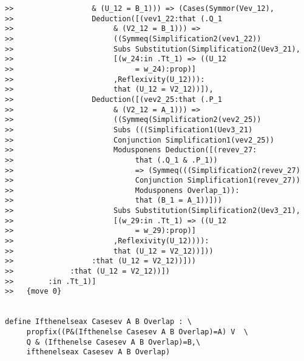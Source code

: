 \documentclass[12pt]{article}
\begin{document}
\begin{verbatim}
>>                  & (U_12 = B_1))) => (Cases(Symmor(Vev_12),
>>                  Deduction([(vev1_22:that (.Q_1 
>>                       & (V2_12 = B_1))) => 
>>                       ((Symmeq(Simplification2(vev1_22)) 
>>                       Subs Substitution(Simplification2(Uev3_21),
>>                       [(w_24:in .Tt_1) => ((U_12 
>>                            = w_24):prop)]
>>                       ,Reflexivity(U_12))):
>>                       that (U_12 = V2_12))]),
>>                  Deduction([(vev2_25:that (.P_1 
>>                       & (V2_12 = A_1))) => 
>>                       ((Symmeq(Simplification2(vev2_25)) 
>>                       Subs (((Simplification1(Uev3_21) 
>>                       Conjunction Simplification1(vev2_25)) 
>>                       Modusponens Deduction([(revev_27:
>>                            that (.Q_1 & .P_1)) 
>>                            => (Symmeq(((Simplification2(revev_27) 
>>                            Conjunction Simplification1(revev_27)) 
>>                            Modusponens Overlap_1)):
>>                            that (B_1 = A_1))]))
>>                       Subs Substitution(Simplification2(Uev3_21),
>>                       [(w_29:in .Tt_1) => ((U_12 
>>                            = w_29):prop)]
>>                       ,Reflexivity(U_12)))):
>>                       that (U_12 = V2_12))]))
>>                  :that (U_12 = V2_12))]))
>>             :that (U_12 = V2_12))])
>>        :in .Tt_1)]
>>   {move 0}


define Ifthenelseax Casesev A B Overlap : \
     propfix((P&(Ifthenelse Casesev A B Overlap)=A) V  \
     Q & (Ifthenelse Casesev A B Overlap)=B,\
     ifthenelseax Casesev A B Overlap)


\end{verbatim}
\end{document}
